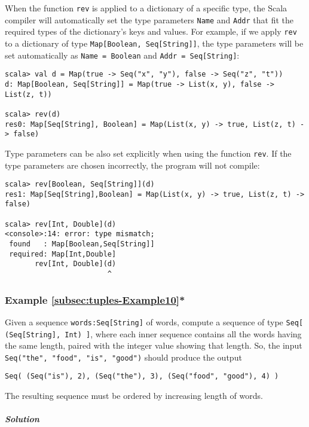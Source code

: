 When the function \lstinline!rev! is applied to a dictionary of a
specific type, the Scala compiler will automatically set the type
parameters \lstinline!Name! and \lstinline!Addr! that fit the required
types of the dictionary's keys and values. For example, if we apply
\lstinline!rev! to a dictionary of type \lstinline!Map[Boolean, Seq[String]]!,
the type parameters will be set automatically as \lstinline!Name = Boolean!
and \lstinline!Addr = Seq[String]!:
\begin{lstlisting}
scala> val d = Map(true -> Seq("x", "y"), false -> Seq("z", "t"))
d: Map[Boolean, Seq[String]] = Map(true -> List(x, y), false -> List(z, t))

scala> rev(d)
res0: Map[Seq[String], Boolean] = Map(List(x, y) -> true, List(z, t) -> false)
\end{lstlisting}
Type parameters can be also set explicitly when using the function
\lstinline!rev!. If the type parameters are chosen incorrectly, the
program will not compile:
\begin{lstlisting}
scala> rev[Boolean, Seq[String]](d)
res1: Map[Seq[String],Boolean] = Map(List(x, y) -> true, List(z, t) -> false)

scala> rev[Int, Double](d)
<console>:14: error: type mismatch;
 found   : Map[Boolean,Seq[String]]
 required: Map[Int,Double]
       rev[Int, Double](d)
                        ^
\end{lstlisting}


\subsubsection{Example \label{subsec:tuples-Example10}\ref{subsec:tuples-Example10}{*}}

Given a sequence \lstinline!words:Seq[String]! of words, compute
a sequence of type \lstinline!Seq[ (Seq[String], Int) ]!, where each
inner sequence contains all the words having the same length, paired
with the integer value showing that length. So, the input \lstinline!Seq("the", "food", "is", "good")!
should produce the output 
\begin{lstlisting}
Seq( (Seq("is"), 2), (Seq("the"), 3), (Seq("food", "good"), 4) )
\end{lstlisting}
The resulting sequence must be ordered by increasing length of words.

\subparagraph{Solution}

